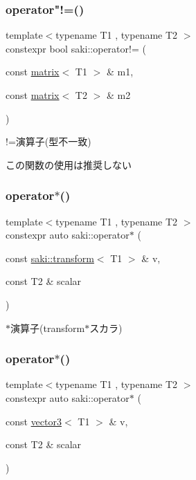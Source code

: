 \subsubsection{\texorpdfstring{operator"!=()}{operator!=()}\hspace{0.1cm}{\footnotesize\ttfamily [11/11]}}
{\footnotesize\ttfamily template$<$typename T1 , typename T2 $>$ \\
constexpr bool saki\+::operator!= (\begin{DoxyParamCaption}\item[{const \mbox{\hyperlink{classsaki_1_1matrix}{matrix}}$<$ T1 $>$ \&}]{m1,  }\item[{const \mbox{\hyperlink{classsaki_1_1matrix}{matrix}}$<$ T2 $>$ \&}]{m2 }\end{DoxyParamCaption})}



!=演算子(型不一致) 

この関数の使用は推奨しない \mbox{\label{namespacesaki_ab9612151e27555ea59013c6a7da3322d}} 
\subsubsection{\texorpdfstring{operator$\ast$()}{operator*()}\hspace{0.1cm}{\footnotesize\ttfamily [1/14]}}
{\footnotesize\ttfamily template$<$typename T1 , typename T2 $>$ \\
constexpr auto saki\+::operator$\ast$ (\begin{DoxyParamCaption}\item[{const \mbox{\hyperlink{classsaki_1_1transform}{saki\+::transform}}$<$ T1 $>$ \&}]{v,  }\item[{const T2 \&}]{scalar }\end{DoxyParamCaption})}



$\ast$演算子(transform$\ast$スカラ) 

\mbox{\label{namespacesaki_abd9716c5a5ccdc1cafb975df8897acb3}} 
\subsubsection{\texorpdfstring{operator$\ast$()}{operator*()}\hspace{0.1cm}{\footnotesize\ttfamily [2/14]}}
{\footnotesize\ttfamily template$<$typename T1 , typename T2 $>$ \\
constexpr auto saki\+::operator$\ast$ (\begin{DoxyParamCaption}\item[{const \mbox{\hyperlink{classsaki_1_1vector3}{vector3}}$<$ T1 $>$ \&}]{v,  }\item[{const T2 \&}]{scalar }\end{DoxyParamCaption})}



